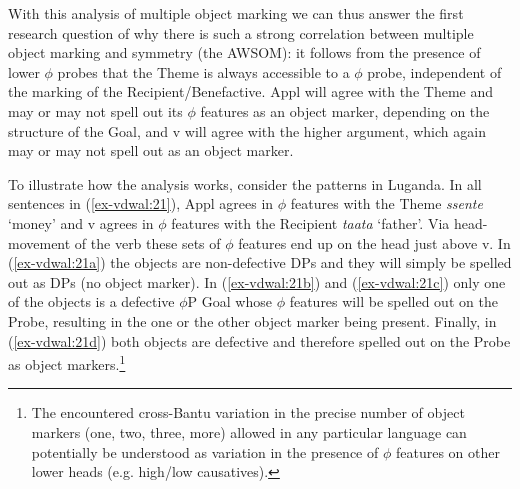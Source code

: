 \documentclass[output=paper
,modfonts
,nonflat]{langsci/langscibook}
\begin{document}
With this analysis of multiple object marking we can thus answer the first research question of why there is such a strong correlation between multiple object marking and symmetry (the AWSOM): it follows from the presence of lower $\phi$ probes that the Theme is always accessible to a $\phi$ probe, independent of the marking of the Recipient/Benefactive. Appl will agree with the Theme and may or may not spell out its $\phi$ features as an object marker, depending on the structure of the Goal, and v will agree with the higher argument, which again may or may not spell out as an object marker. 

To illustrate how the analysis works, consider the patterns in Luganda. In all sentences in (\ref{ex-vdwal:21}), Appl agrees in $\phi $ features with the Theme \textit{ssente} ‘money’ and v agrees in $\phi$ features with the Recipient \textit{taata} ‘father’. Via head-movement of the verb these sets of $\phi$ features end up on the head just above v. In (\ref{ex-vdwal:21a}) the objects are non-defective DPs and they will simply be spelled out as DPs (no object marker). In (\ref{ex-vdwal:21b}) and (\ref{ex-vdwal:21c}) only one of the objects is a defective $\phi$P Goal whose $\phi$ features will be spelled out on the Probe, resulting in the one or the other object marker being present. Finally, in (\ref{ex-vdwal:21d}) both objects are defective and therefore spelled out on the Probe as object markers.\footnote{The encountered cross-Bantu variation in the precise number of object markers (one, two, three, more) allowed in any particular language \citep{Polak1986, Marlo2015} can potentially be understood as variation in the presence of $\phi$ features on other lower heads (e.g. high/low causatives).}
\end{document}

